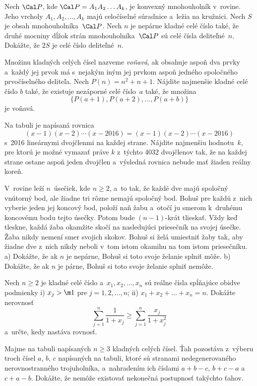 {%
Nech $\Cal P$, kde $\Cal P=A_1A_2\dots A_k$, je konvexný mnohouholník v~rovine. Jeho vrcholy $A_1,A_2,\dots,A_k$ majú celočíselné súradnice a~ležia na kružnici. Nech $S$ je obsah mnohouholníka~$\Cal P$. Nech $n$ je nepárne kladné celé číslo také, že druhé mocniny dĺžok strán mnohouholníka~$\Cal P$ sú celé čísla deliteľné~$n$. Dokážte, že $2S$ je celé číslo deliteľné~$n$.}

{%
Množinu kladných celých čísel nazveme {\it voňavá}, ak obsahuje aspoň dva prvky a~každý jej prvok má s~nejakým iným jej prvkom aspoň jedného spoločného prvočíselného deliteľa. Nech $P(n)=n^2+n+1$. Nájdite najmenšie kladné celé číslo $b$ také, že existuje nezáporné celé číslo~$a$ také, že množina
$$
\{P(a+1), P(a+2), \dots, P(a+b) \}
$$
je voňavá.}

{%
Na tabuli je napísaná rovnica
$$
(x-1)(x-2)\cdots(x-2016) = (x-1)(x-2)\cdots(x-2016)
$$
s~2016 lineárnymi dvojčlenmi na každej strane. Nájdite najmenšiu hodnotu~$k$, pre ktorú je možné vymazať práve $k$ z~týchto 4032 dvojčlenov tak,
že na každej strane ostane aspoň jeden dvojčlen a~výsledná rovnica nebude mať žiaden reálny koreň.}

{%
V~rovine leží $n$~úsečiek, kde $n\ge 2$, a~to tak, že každé dve majú spoločný vnútorný bod, ale žiadne tri rôzne nemajú spoločný bod. Bohuš pre každú z~nich vyberie jeden jej koncový bod, položí naň žabu a~otočí ju smerom k~druhému koncovému bodu tejto úsečky. Potom bude $(n-1)$-krát tlieskať. Vždy keď tleskne, každá žaba okamžite skočí na nasledujúci priesečník na svojej úsečke. Žaba nikdy nemení smer svojich skokov. Bohuš si želá umiestniť žaby tak, aby žiadne dve z~nich nikdy neboli v~tom istom okamihu na tom istom priesečníku.
\ite a) Dokážte, že ak $n$ je nepárne, Bohuš si toto svoje želanie splniť môže.
\ite b) Dokážte, že ak $n$ je párne, Bohuš si toto svoje želanie splniť nemôže.
}

{%
Nech $n \ge 2$ je kladné celé číslo a~$x_1,x_2,\dots,x_n$ sú reálne čísla spĺňajúce obidve podmienky
\ite i) $x_j>\m1$ pre $j=1,2,\dots,n$;
\ite ii) $x_1+x_2+\dots+x_n=n$.\endgraf
\noindent
Dokážte nerovnosť
$$
\sum_{j=1}^n \frac{1}{1+x_j} \ge \sum_{j=1}^n \frac{x_j}{1+x_j^2}
$$
a~určte, kedy nastáva rovnosť.}

{%
Majme na tabuli napísaných $n\ge 3$ kladných celých čísel. Ťah pozostáva z~výberu troch čísel $a$, $b$, $c$ napísaných na tabuli, ktoré sú stranami nedegenerovaného nerovnostranného trojuholníka, a~nahradením ich číslami $a+b-c$, $b+c-a$ a~$c+a-b$.
Dokážte, že nemôže existovať nekonečná postupnosť takýchto ťahov.}

